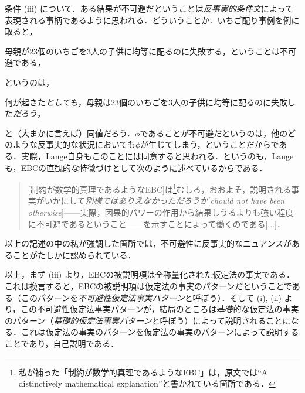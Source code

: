 \documentclass[dvipdfmx,twoside,11pt,uplatex]{jsarticle}
\newcommand{\myterm}[2]{{\emph{#1}}{[\emph{#2}]}}
\theoremstyle{definition}
\begin{document}
条件 (iii) について．ある結果が不可避だということは\emph{反事実的条件文}によって表現される事柄であるように思われる．どういうことか．いちご配り事例を例に取ると，
\begin{exe}
    \ex 母親が23個のいちごを3人の子供に均等に配るのに失敗する，ということは不可避である，
\end{exe}
というのは，
\begin{exe}
    \ex 何が起きた\emph{としても}，母親は23個のいちごを3人の子供に均等に配るのに失敗した\emph{だろう}，
\end{exe}
と（大まかに言えば）同値だろう．$\phi$であることが不可避だというのは，他のどのような反事実的な状況においても$\phi$が生じてしまう，ということだからである．実際，Lange自身もこのことには同意すると思われる．というのも，Langeも，EBCの直観的な特徴づけとして次のように述べているからである．
\begin{quote}
    [制約が数学的真理であるようなEBC]は\footnote{
    私が補った「制約が数学的真理であるようなEBC」は，原文では``A distinctively mathematical explanation''と書かれている箇所である．
    }むしろ，おおよそ，説明される事実がいかにして\myterm{別様ではありえなかっただろうか}{chould not have been otherwise}------実際，因果的パワーの作用から結果しうるよりも強い程度に不可避であるということ------を示すことによって働くのである[$\ldots$]．\citep[強調筆者,][5--6]{lange2016bwc}
\end{quote}
以上の記述の中の私が強調した箇所では，不可避性に反事実的なニュアンスがあることがたしかに認められている．

以上，まず (iii) より，EBCの被説明項は全称量化された仮定法の事実である．これは換言すると，EBCの被説明項は仮定法の事実のパターンだということである（このパターンを\emph{不可避性仮定法事実パターン}と呼ぼう）．そして (i), (ii) より，この不可避性仮定法事実パターンが，結局のところは基礎的な仮定法の事実のパターン（\emph{基礎的仮定法事実パターン}と呼ぼう）によって説明されることになる．これは仮定法の事実のパターンを仮定法の事実のパターンによって説明することであり，自己説明である．
\end{document}
